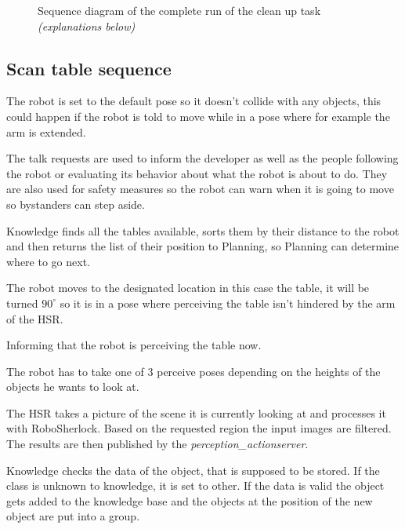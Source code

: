 \documentclass[main.tex]{subfiles}
\begin{document}
\begin{figure}
	  		\caption{Sequence diagram of the complete run of the clean up task \textit{(explanations below)}}
	  		\label{Clean Up sequence}
	  	\end{figure}
		

	\subsection{Scan table sequence}
	The robot is set to the default pose so it doesn't collide with any objects, this could happen if the robot is told to move while in a pose where for example the arm is extended.
	
	
	The talk requests are used to inform the developer as well as the people following the robot or evaluating its behavior about what the robot is about to do. They are also used for safety measures so the robot can warn when it is going to move so bystanders can step aside. 
	
	Knowledge finds all the tables available, sorts them by their distance to the robot and then returns the list of their position to Planning, so Planning can determine where to go next.
	
	
	The robot moves to the designated location in this case the table, it will be turned $90^\circ$ so it is in a pose where perceiving the table isn't hindered by the arm of the HSR. 
	
	Informing that the robot is perceiving the table now.
	
	The robot has to take one of 3 perceive poses depending on the heights of the objects he wants to look at.
	
	The HSR takes a picture of the scene it is currently looking at and processes it with RoboSherlock. Based on the requested region the input images are filtered. The results are then published by the \textit{perception\_actionserver}.

	
	Knowledge checks the data of the object, that is supposed to be stored. If the class is unknown to knowledge, it is set to other. If the data is valid the object gets added to the knowledge base and the objects at the position of the new object are put into a group.
	
\end{document}
